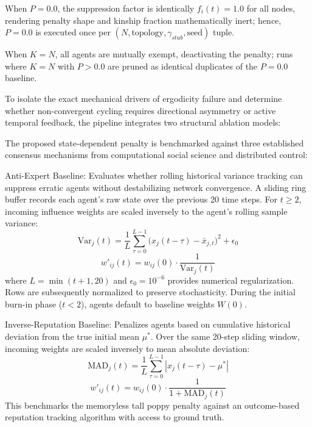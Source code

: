 When $P = 0.0$, the suppression factor is identically $f_i(t) = 1.0$ for all nodes, rendering penalty shape and kinship fraction mathematically inert; hence, $P = 0.0$ is executed once per $(N, \text{topology}, \gamma_{stub}, \text{seed})$ tuple\cite{acemoglu2013opinion}.

When $K = N$, all agents are mutually exempt, deactivating the penalty; runs where $K = N$ with $P > 0.0$ are pruned as identical duplicates of the $P = 0.0$ baseline\cite{acemoglu2013opinion}.

To isolate the exact mechanical drivers of ergodicity failure and determine whether non-convergent cycling requires directional asymmetry or active temporal feedback, the pipeline integrates two structural ablation models\cite{degroot1974reaching}:

The proposed state-dependent penalty is benchmarked against three established consensus mechanisms from computational social science and distributed control\cite{degroot1974reaching}:

Anti-Expert Baseline: Evaluates whether rolling historical variance tracking can suppress erratic agents without destabilizing network convergence\cite{degroot1974reaching}. A sliding ring buffer records each agent's raw state over the previous 20 time steps\cite{friedkin1990social,acemoglu2013opinion}. For $t \ge 2$, incoming influence weights are scaled inversely to the agent's rolling sample variance\cite{friedkin1990social,acemoglu2013opinion}: $$\text{Var}_j(t) = \frac{1}{L} \sum_{\tau=0}^{L-1} \big(x_j(t - \tau) - \bar{x}_{j,t}\big)^2 + \epsilon_0$$ $$w'_{ij}(t) = w_{ij}(0) \cdot \frac{1}{\text{Var}_j(t)}$$ where $L = \min(t + 1, 20)$ and $\epsilon_0 = 10^{-6}$ provides numerical regularization\cite{friedkin1990social,acemoglu2013opinion}. Rows are subsequently normalized to preserve stochasticity\cite{friedkin1990social}. During the initial burn-in phase ($t < 2$), agents default to baseline weights $W(0)$\cite{acemoglu2013opinion}.

Inverse-Reputation Baseline: Penalizes agents based on cumulative historical deviation from the true initial mean $\mu^*$\cite{degroot1974reaching,acemoglu2013opinion}. Over the same 20-step sliding window, incoming weights are scaled inversely to mean absolute deviation\cite{degroot1974reaching,friedkin1990social}: $$\text{MAD}_j(t) = \frac{1}{L} \sum_{\tau=0}^{L-1} |x_j(t - \tau) - \mu^*|$$ $$w'_{ij}(t) = w_{ij}(0) \cdot \frac{1}{1 + \text{MAD}_j(t)}$$ This benchmarks the memoryless tall poppy penalty against an outcome-based reputation tracking algorithm with access to ground truth\cite{degroot1974reaching}.

